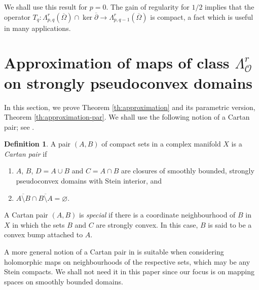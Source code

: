 \documentclass[11pt]{amsart}
\numberwithin{equation}{section}
\theoremstyle{definition}
\newtheorem{definition}[theorem]{Definition}
\newcommand\Oscr{\mathscr{O}}
\newcommand\dibar{\overline\partial}
\begin{document}
We shall use this result for $p=0$.
The gain of regularity for $1/2$ implies that the operator 
$T_q: \Lambda^r_{p,q}(\overline \Omega)\cap\ker \dibar
\to \Lambda^{r}_{p,q-1}(\overline \Omega)$ is compact, 
a fact which is useful in many applications. 

%
%
%
%
\section{Approximation of maps of class 
$\Lambda^r_\Oscr$ on strongly pseudoconvex domains}
\label{sec:approximation}

In this section, we prove Theorem \ref{th:approximation} and its
parametric version, Theorem \ref{th:approximation-par}. 
We shall use the following notion of a Cartan pair; 
see \cite[Definitions 5.7.1 and 5.10.2]{Forstneric2017E}.

%
%
\begin{definition}\label{def:Cartan-pair}
A pair $(A,B)$ of compact sets in a complex manifold $X$ is a 
{\em Cartan pair} if 
%
\begin{enumerate}[\rm (i)]
\item $A$, $B$, $D=A\cup B$ and $C=A\cap B$ are closures of 
smoothly bounded, strongly pseudoconvex domains with Stein
interior, and
%
\item 
$\overline{A\setminus B}\cap \overline{B\setminus A} =\varnothing$.
\end{enumerate}
A Cartan pair $(A,B)$ is {\em special} if there is a coordinate
neighbourhood of $B$ in $X$ in which the sets $B$ and $C$ 
are strongly convex. In this case, $B$ is said to be a convex bump 
attached to $A$.
\end{definition}

A more general notion of a Cartan pair in
\cite[Definition 5.7.1 (I)]{Forstneric2017E} is suitable 
when considering holomorphic maps on neighbourhoods of 
the respective sets, which may be any Stein compacts. 
We shall not need it in this paper since our 
focus is on mapping spaces on smoothly bounded domains. 
\end{document}
